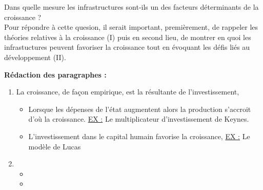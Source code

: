 Dans quelle mesure les infrastructures sont-ils un des facteurs déterminants de la croissance ?\\

Pour répondre à cette quesion, il serait important, premièrement, de rappeler les théories relatives à la croissance (I) puis en second lieu, de montrer en quoi les infrastuctures peuvent favoriser la croissance tout en évoquant les défis liés au développement (II). \newline
 
\noindent \textbf{Rédaction des paragraphes :}
\begin{enumerate}[label*=$\longrightarrow$]
	\item La croissance, de façon empirique, est la résultante de l'investissement,
	\begin{itemize}
		\item Lorsque les dépenses de l'état augmentent alors la production s'accroit d'où la croissance. \newline \underline{EX :} Le multiplicateur d'investissement de Keynes.
		\item L'investissement dans le capital humain favorise la croissance, \newline \underline{EX :} Le modèle de Lucas
	\end{itemize}
	\item 
	\begin{itemize}
		\item 
		\item 
	\end{itemize}
\end{enumerate}
